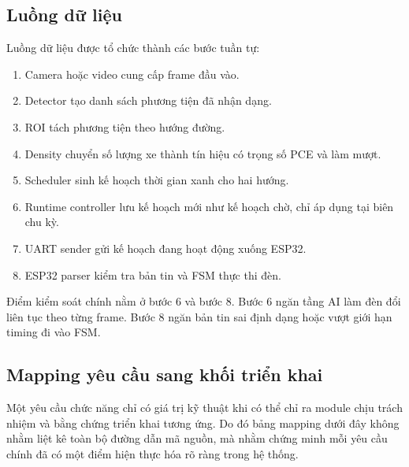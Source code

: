 \subsection{Luồng dữ liệu}

Luồng dữ liệu được tổ chức thành các bước tuần tự:

\begin{enumerate}
  \item Camera hoặc video cung cấp frame đầu vào.
  \item Detector tạo danh sách phương tiện đã nhận dạng.
  \item ROI tách phương tiện theo hướng đường.
  \item Density chuyển số lượng xe thành tín hiệu có trọng số PCE và làm mượt.
  \item Scheduler sinh kế hoạch thời gian xanh cho hai hướng.
  \item Runtime controller lưu kế hoạch mới như kế hoạch chờ, chỉ áp dụng tại biên chu kỳ.
  \item UART sender gửi kế hoạch đang hoạt động xuống ESP32.
  \item ESP32 parser kiểm tra bản tin và FSM thực thi đèn.
\end{enumerate}

Điểm kiểm soát chính nằm ở bước 6 và bước 8. Bước 6 ngăn tầng AI làm đèn đổi liên tục theo từng frame. Bước 8 ngăn bản tin sai định dạng hoặc vượt giới hạn timing đi vào FSM.

\subsection{Mapping yêu cầu sang khối triển khai}

Một yêu cầu chức năng chỉ có giá trị kỹ thuật khi có thể chỉ ra module chịu trách nhiệm và bằng chứng triển khai tương ứng. Do đó bảng mapping dưới đây không nhằm liệt kê toàn bộ đường dẫn mã nguồn, mà nhằm chứng minh mỗi yêu cầu chính đã có một điểm hiện thực hóa rõ ràng trong hệ thống.

